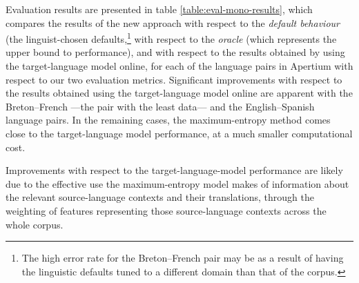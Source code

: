 \documentclass[11pt]{article}
\newcommand{\comment}[1]{\todo{#1}}
\begin{document}
 Evaluation results are presented in 
 table \ref{table:eval-mono-results}, which compares the results of
 the new approach with respect to the \emph{default behaviour} (the
 linguist-chosen defaults,\footnote{The high error rate
   for the Breton--French pair may be as a result of having the
   linguistic defaults tuned to a different domain than that of the
   corpus.}  with respect to the \emph{oracle} (which represents the
 upper bound to performance), and with respect to the results obtained
 by using the target-language model online, for each of the language
 pairs in Apertium with respect to our two evaluation metrics.
 Significant improvements with respect to the results obtained using
 the target-language model online are apparent with the Breton--French
 ---the pair with the least data--- and the English--Spanish language
 pairs. In the remaining cases, the maximum-entropy method comes close
 to the target-language model performance, at a much smaller
 computational cost.



Improvements with
 respect to the target-language-model performance are likely due
 to the effective use the maximum-entropy model makes of information
 about the relevant source-language contexts and their translations,
 through the weighting of features representing those source-language
 contexts across the whole corpus. 

\end{document}
